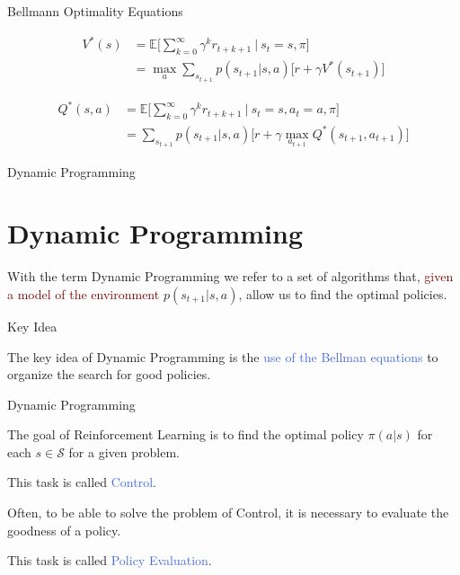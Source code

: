 \documentclass{beamer}
\begin{document}
\begin{frame}{Bellmann Optimality Equations}



   \begin{align*}
	V^{*}(s)& = \mathds{E} \bigg[\sum_{k=0}^{\infty}\gamma^{k} r_{t+k+1} \: \bigg| \: s_t=s,\pi \bigg] \\
		   & = \max_a \sum_{s_{t+1}} p(s_{t+1}|s,a)\big[r + \gamma V^{*}(s_{t+1}) \big] 
	\end{align*}
	
	   \begin{align*}
	Q^{*}(s,a)& = \mathds{E} \bigg[\sum_{k=0}^{\infty}\gamma^{k} r_{t+k+1} \: \bigg| \: s_t=s, a_t=a,\pi \bigg] \\
		   & = \sum_{s_{t+1}} p(s_{t+1}|s,a)\big[r + \gamma \max_{a_{t+1}}Q^{*}(s_{t+1}, a_{t+1}) \big] 
	\end{align*}

\end{frame}



\begin{frame}{Dynamic Programming}
\section{Dynamic Programming}

With the term Dynamic Programming we refer to a set of algorithms that, \textcolor{Maroon}{given a model of the environment} $p(s_{t+1}| s, a)$, allow us to find the optimal policies.

\vspace{3mm}

\begin{block}{Key Idea}
\begin{normalsize}
The key idea of Dynamic Programming is the \textcolor{RoyalBlue}{use of the Bellman equations} to organize the search for good policies.
\end{normalsize}
\end{block}
\end{frame}

\begin{frame}{Dynamic Programming}

The goal of Reinforcement Learning is to find the optimal policy $\pi(a|s)$ for each $s \in \mathcal{S}$ for a given problem. 

This task is called \textcolor{RoyalBlue}{Control}.

\vspace{3mm}

Often, to be able to solve the problem of Control, it is necessary to evaluate the goodness of a policy.

This task is called \textcolor{RoyalBlue}{Policy Evaluation}.

\end{frame}
\end{document}
